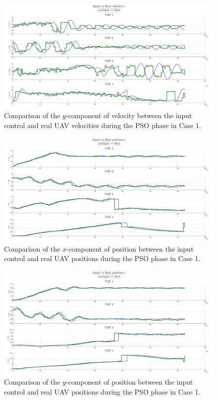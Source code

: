 \documentclass[main]{subfiles}
\begin{document}
\begin{figure}
    \centering
    \includegraphics[width=\textwidth]{images/comparison_velocity-y_pso.pdf}
    \caption[Velocity-Y Case 1]{Comparison of the $y$-component of velocity between the input control and real UAV velocities during the PSO phase in Case 1.}
    \label{fig:velocity_y_pso}
\end{figure}

\begin{figure}
    \centering
    \includegraphics[width=\textwidth]{images/comparison_position-x_pso.pdf}
    \caption[Position-X Case 1]{Comparison of the $x$-component of position between the input control and real UAV positions during the PSO phase in Case 1.}
    \label{fig:position_x_pso}
\end{figure}

\begin{figure}
    \centering
    \includegraphics[width=\textwidth]{images/comparison_position-y_pso.pdf}
    \caption[Position-Y Case 1]{Comparison of the $y$-component of position between the input control and real UAV positions during the PSO phase in Case 1.}
    \label{fig:position_y_pso}
\end{figure}
\end{document}
